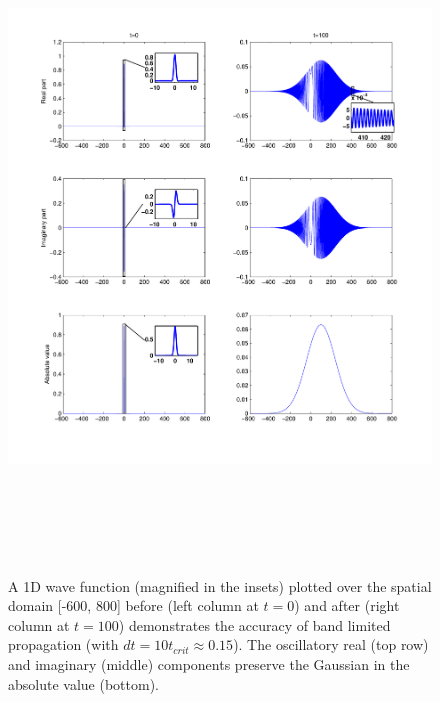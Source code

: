 \documentclass[review,letterpaper]{elsarticle}
\begin{document}
\begin{figure}[hbtp]
\hspace{-.6in}
\includegraphics[width=5.6in,height=7in]{freeSpace}
\vspace{-.8in}
\caption{A 1D wave function (magnified in the insets) plotted over the spatial domain [-600, 800]
  before (left column at $t=0$) and after (right column at $t=100$) demonstrates
  the accuracy of band limited propagation (with $dt=10t_{crit}\approx0.15$). 
  The oscillatory  real (top row) and imaginary (middle) components preserve the Gaussian
  in the absolute value (bottom).}
\label{F:freeSpace}
\end{figure}
\end{document}
